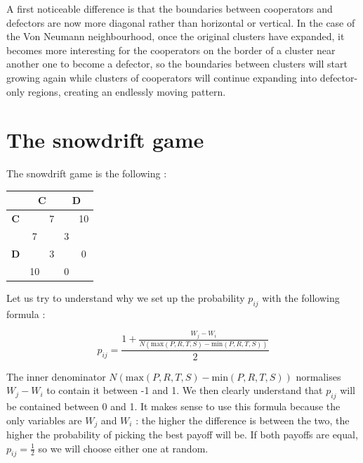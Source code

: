 \documentclass[a4paper]{article}
\begin{document}
A first noticeable difference is that the boundaries between cooperators and
defectors are now more diagonal rather than horizontal or vertical. In the 
case of the Von Neumann neighbourhood, once the original clusters have 
expanded, it becomes more interesting for the cooperators on the border of
a cluster near another one to become a defector, so the boundaries between
clusters will start growing again while clusters of cooperators will continue
expanding into defector-only regions, creating an endlessly moving pattern.


\section{The snowdrift game}
The snowdrift game is the following :
\begin{table}[H]
\centering
\begin{tabular}{c|cc|cc}
	& \multicolumn{2}{c|}{\textbf{C}} & \multicolumn{2}{c}{\textbf{D}}\\
	\hline
	\textbf{C} && 7 && 10\\
	& 7 && 3 &\\
	\hline
	\textbf{D} && 3 && 0\\
	& 10 && 0 &\\
\end{tabular}
\end{table}
Let us try to understand why we set up the probability $p_{ij}$ with the
following formula :

$$ p_{ij} = \frac{
	1 + \frac{W_j-W_i}{N(\text{max}(P,R,T,S)-\text{min}(P,R,T,S))}
	}
	{2}$$

The inner denominator $N(\text{max}(P,R,T,S)-\text{min}(P,R,T,S))$
normalises $W_j-W_i$ to contain it between -1 and 1. We then clearly 
understand that $p_{ij}$ will be contained between 0 and 1. It makes sense
to use this formula because the only variables are $W_j$ and $W_i$ : the higher
the difference is between the two, the higher the probability of picking the 
best payoff will be. If both payoffs are equal, $p_{ij} = \frac{1}{2}$ so 
we will choose either one at random.
\end{document}
